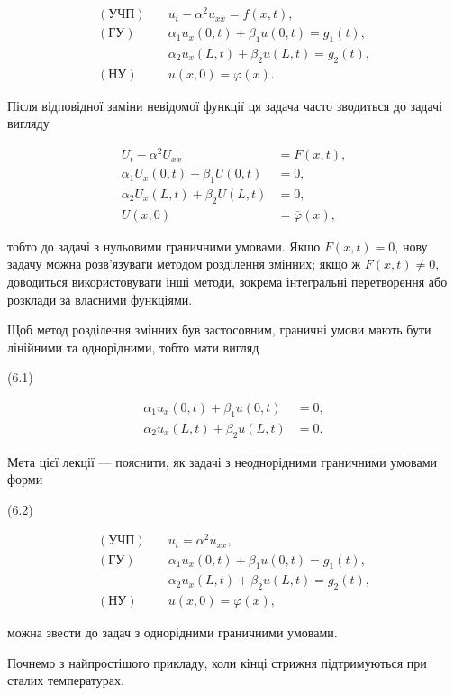 \documentclass[
  ukrainian,
]{article}
\begin{document}
\[
\begin{aligned}
(\text{УЧП})\quad & u_t - \alpha^2 u_{xx} = f(x,t), \\
(\text{ГУ})\quad & \alpha_1 u_x(0,t) + \beta_1 u(0,t) = g_1(t), \\
& \alpha_2 u_x(L,t) + \beta_2 u(L,t) = g_2(t), \\
(\text{НУ})\quad & u(x,0) = \varphi(x).
\end{aligned}
\]

Після відповідної заміни невідомої функції ця задача часто зводиться до
задачі вигляду

\[
\begin{aligned}
U_t - \alpha^2 U_{xx} &= F(x,t), \\
\alpha_1 U_x(0,t) + \beta_1 U(0,t) &= 0, \\
\alpha_2 U_x(L,t) + \beta_2 U(L,t) &= 0, \\
U(x,0) &= \overline{\varphi}(x),
\end{aligned}
\]

тобто до задачі з нульовими граничними умовами. Якщо \(F(x,t)=0\), нову
задачу можна розв'язувати методом розділення змінних; якщо ж
\(F(x,t)\neq 0\), доводиться використовувати інші методи, зокрема
інтегральні перетворення або розклади за власними функціями.

Щоб метод розділення змінних був застосовним, граничні умови мають бути
лінійними та однорідними, тобто мати вигляд

(6.1)

\[
\begin{aligned}
\alpha_1 u_x(0,t) + \beta_1 u(0,t) &= 0, \\
\alpha_2 u_x(L,t) + \beta_2 u(L,t) &= 0.
\end{aligned}
\]

Мета цієї лекції --- пояснити, як задачі з неоднорідними граничними
умовами форми

(6.2)

\[
\begin{aligned}
(\text{УЧП})\quad & u_t = \alpha^2 u_{xx}, \\
(\text{ГУ})\quad & \alpha_1 u_x(0,t) + \beta_1 u(0,t) = g_1(t), \\
& \alpha_2 u_x(L,t) + \beta_2 u(L,t) = g_2(t), \\
(\text{НУ})\quad & u(x,0) = \varphi(x),
\end{aligned}
\]

можна звести до задач з однорідними граничними умовами.

Почнемо з найпростішого прикладу, коли кінці стрижня підтримуються при
сталих температурах.
\end{document}

